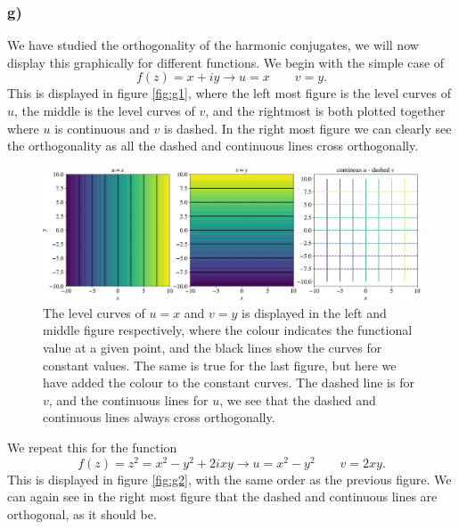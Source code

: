 \documentclass[12pt,twoside]{article}
\begin{document}
\subsubsection*{g)}
We have studied the orthogonality of the harmonic conjugates, we will now display this graphically for different functions. We begin with the simple case of
\begin{equation}
  f(z) = x+iy \rightarrow u=x\qquad v=y.
\end{equation}
This is displayed in figure \vref{fig:g1}, where the left most figure is the level curves of $u$, the middle is the level curves of $v$, and the rightmost is both plotted together where $u$ is continuous and $v$ is dashed. In the right most figure we can clearly see the orthogonality as all the dashed and continuous lines cross orthogonally. \par
\begin{figure}
  \centering
  \includegraphics[width=\textwidth]{../figures/first.pdf}
  \caption{The level curves of $u=x$ and $v=y$ is displayed in the left and middle figure respectively, where the colour indicates the functional value at a given point, and the black lines show the curves for constant values. The same is true for the last figure, but here we have added the colour to the constant curves. The dashed line is for $v$, and the continuous lines for $u$, we see that the dashed and continuous lines always cross orthogonally.}
  \label{fig:g1}
\end{figure}
We repeat this for the function
\begin{equation}
  f(z) = z^2 = x^2-y^2+2ixy \rightarrow u=x^2-y^2\qquad v=2xy.
\end{equation}
This is displayed in figure \vref{fig:g2}, with the same order as the previous figure. We can again see in the right most figure that the dashed and continuous lines are orthogonal, as it should be.\par
\end{document}
